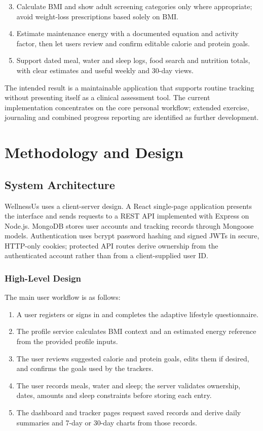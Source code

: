 \documentclass[10pt,a4paper,openany]{report}
\newcommand{\reportchapter}[1]{\chapter{#1}}
\begin{document}
\begin{enumerate}
\setcounter{enumi}{2}
\item Calculate BMI and show adult screening categories only where appropriate; avoid weight-loss prescriptions based solely on BMI.
\item Estimate maintenance energy with a documented equation and activity factor, then let users review and confirm editable calorie and protein goals.
\item Support dated meal, water and sleep logs, food search and nutrition totals, with clear estimates and useful weekly and 30-day views.
\end{enumerate}

The intended result is a maintainable application that supports routine tracking without presenting itself as a clinical assessment tool. The current implementation concentrates on the core personal workflow; extended exercise, journaling and combined progress reporting are identified as further development.
\clearpage

\reportchapter{Methodology and Design}
\section{System Architecture}
WellnessUs uses a client-server design. A React single-page application presents the interface and sends requests to a REST API implemented with Express on Node.js. MongoDB stores user accounts and tracking records through Mongoose models. Authentication uses bcrypt password hashing and signed JWTs in secure, HTTP-only cookies; protected API routes derive ownership from the authenticated account rather than from a client-supplied user ID.

\subsection{High-Level Design}
The main user workflow is as follows:
\begin{enumerate}
\item A user registers or signs in and completes the adaptive lifestyle questionnaire.
\item The profile service calculates BMI context and an estimated energy reference from the provided profile inputs.
\item The user reviews suggested calorie and protein goals, edits them if desired, and confirms the goals used by the trackers.
\item The user records meals, water and sleep; the server validates ownership, dates, amounts and sleep constraints before storing each entry.
\item The dashboard and tracker pages request saved records and derive daily summaries and 7-day or 30-day charts from those records.
\end{enumerate}
\end{document}
